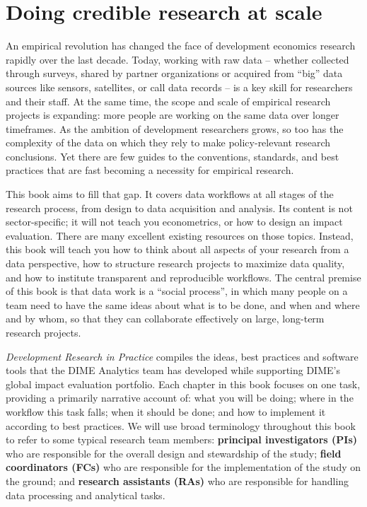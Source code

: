 
\section{Doing credible research at scale}

An empirical revolution has changed the face of development economics research rapidly over the last decade.
Today, working with raw data --
whether collected through surveys,
shared by partner organizations
or acquired from ``big'' data sources
like sensors, satellites, or call data records --
is a key skill for researchers and their staff.
At the same time, the scope and scale of empirical research projects is expanding:
more people are working on the same data over longer timeframes.
As the ambition of development researchers grows, so too has the complexity of the data
on which they rely to make policy-relevant research conclusions.
Yet there are few guides to the conventions, standards, and best practices
that are fast becoming a necessity for empirical research.

This book aims to fill that gap.
It covers data workflows at all stages of the research process,
from design to data acquisition and analysis.
Its content is not sector-specific;
it will not teach you econometrics,
or how to design an impact evaluation.
There are many excellent existing resources on those topics.
Instead, this book will teach you how to think about all aspects of your research from a data perspective,
how to structure research projects to maximize data quality,
and how to institute transparent and reproducible workflows.
The central premise of this book is that data work is a ``social process'',
in which many people on a team need to have the same ideas
about what is to be done, and when and where and by whom,
so that they can collaborate effectively on large, long-term research projects.

\textit{Development Research in Practice} compiles the ideas, best practices and software tools
that the DIME Analytics team
has developed while supporting DIME's global impact evaluation portfolio.
Each chapter in this book focuses on one task, providing a primarily narrative account of:
what you will be doing; where in the workflow this task falls;
when it should be done; and how to implement it according to best practices.
We will use broad terminology throughout this book to refer to some typical research team members:
\textbf{principal investigators (PIs)} who are responsible for
the overall design and stewardship of the study;
\textbf{field coordinators (FCs)} who are responsible for
the implementation of the study on the ground;
and \textbf{research assistants (RAs)} who are responsible for
handling data processing and analytical tasks.

